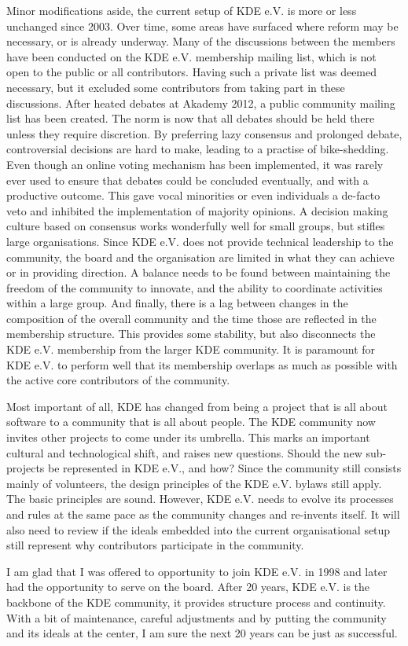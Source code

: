 Minor modifications aside, the current setup of KDE e.V. is more or
less unchanged since 2003. Over time, some areas have surfaced where
reform may be necessary, or is already underway. Many of the
discussions between the members 
have been conducted on the KDE e.V. membership mailing list, which is
not open to the public or all contributors. Having such a private list
was deemed necessary, but it excluded some contributors from taking
part in these discussions. After heated debates at Akademy 2012, a
public community mailing list has been created. The norm is now that all
debates should be held there unless they require discretion. By
preferring lazy consensus and prolonged debate, controversial decisions
are hard to make, leading to a practise of bike-shedding.
Even though an online voting mechanism has been implemented, it was
rarely ever used to ensure that debates could be concluded eventually,
and with a productive outcome. This gave vocal minorities or even
individuals a de-facto veto and inhibited the implementation of
majority opinions. A decision making culture based on consensus works
wonderfully well for small groups, but stifles large organisations.
Since KDE e.V. does not provide technical leadership to
the community, the board and the organisation are limited in what they
can achieve or in providing direction. A balance needs to be found
between maintaining the freedom of the community to innovate, and the
ability to coordinate activities within a large group. And finally,
there is a lag between changes in the composition of the overall
community and the time those are reflected in the membership
structure. This provides some stability, but also disconnects the KDE
e.V. membership from the larger KDE community. It is paramount
for KDE e.V. to perform well that its membership overlaps as much as
possible with the active core contributors of the community.

Most important of all, KDE has changed from being a project that is
all about software to a community that is all about people. The KDE
community now invites other projects to come under its umbrella. This
marks an important cultural and technological shift, and raises new
questions. Should the new sub-projects be represented in KDE e.V., and
how? Since the community still consists mainly of volunteers, the
design principles of the KDE e.V. bylaws still apply. The basic
principles are sound. However, KDE e.V. needs to evolve its processes
and rules at the same pace as the community changes and re-invents
itself. It will also need to review if the ideals embedded into the
current organisational setup still represent why contributors
participate in the community. 

I am glad that I was offered to opportunity to join KDE e.V. in 1998
and later had the opportunity to serve on the board. After 20 years,
KDE e.V. is the backbone of the KDE community, it provides structure
process and continuity. With a bit of maintenance, careful adjustments
and by putting the community and its ideals at the center, I am sure
the next 20 years can be just as successful. 


